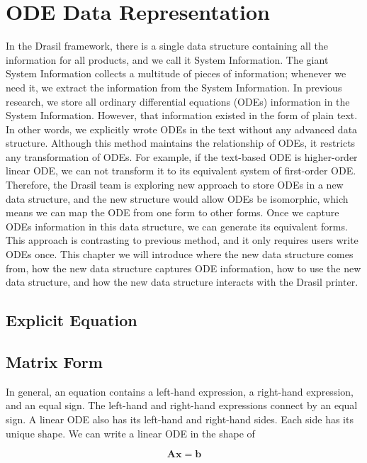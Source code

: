 \chapter{ODE Data Representation}
In the Drasil framework, there is a single data structure containing all the information for all products, and we call it System Information. The giant System Information collects a multitude of pieces of information; whenever we need it, we extract the information from the System Information. In previous research, we store all ordinary differential equations (ODEs) information in the System Information. However, that information existed in the form of plain text. In other words, we explicitly wrote ODEs in the text without any advanced data structure. Although this method maintains the relationship of ODEs, it restricts any transformation of ODEs. For example, if the text-based ODE is higher-order linear ODE, we can not transform it to its equivalent system of first-order ODE. Therefore, the Drasil team is exploring new approach to store ODEs in a new data structure, and the new structure would allow ODEs be isomorphic, which means we can map the ODE from one form to other forms. Once we capture ODEs information in this data structure, we can generate its equivalent forms. This approach is contrasting to previous method, and it only requires users write ODEs once. This chapter we will introduce where the new data structure comes from, how the new data structure captures ODE information, how to use the new data structure, and how the new data structure interacts with the Drasil printer.

\section{Explicit Equation}

\section{Matrix Form}
In general, an equation contains a left-hand expression, a right-hand expression, and an equal sign. The left-hand and right-hand expressions connect by an equal sign. A linear ODE also has its left-hand and right-hand sides. Each side has its unique shape. We can write a linear ODE in the shape of

\begin{equation} \label{eq_matrixform}
	\boldsymbol{Ax} = \boldsymbol{b}
\end{equation}

